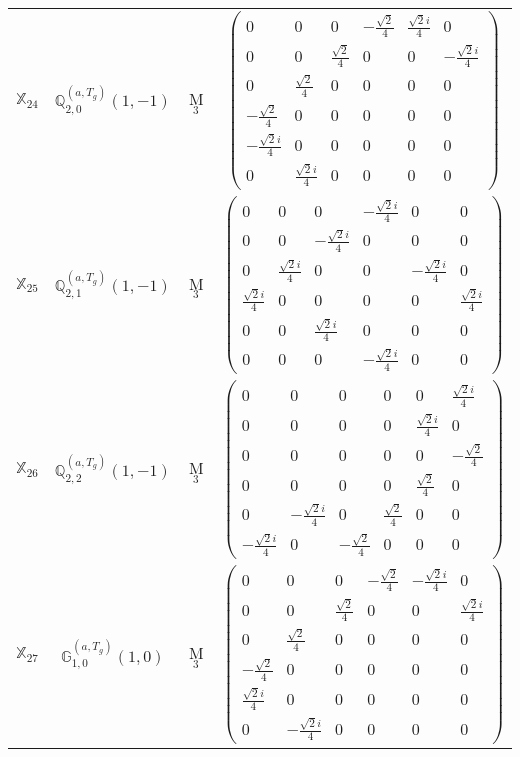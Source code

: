 \documentclass[fleqn,10pt,landscape]{article}
\begin{document}
\begin{itemize}
\begin{center}
\begin{longtable}{c|c|c|c}
$ \mathbb{X}_{24} $ & $\mathbb{Q}_{2,0}^{(a,T_{g})}(1,-1)$ & M$_{3}$ & $\begin{pmatrix} 0 & 0 & 0 & - \frac{\sqrt{2}}{4} & \frac{\sqrt{2} i}{4} & 0 \\ 0 & 0 & \frac{\sqrt{2}}{4} & 0 & 0 & - \frac{\sqrt{2} i}{4} \\ 0 & \frac{\sqrt{2}}{4} & 0 & 0 & 0 & 0 \\ - \frac{\sqrt{2}}{4} & 0 & 0 & 0 & 0 & 0 \\ - \frac{\sqrt{2} i}{4} & 0 & 0 & 0 & 0 & 0 \\ 0 & \frac{\sqrt{2} i}{4} & 0 & 0 & 0 & 0 \end{pmatrix}$ \\
$ \mathbb{X}_{25} $ & $\mathbb{Q}_{2,1}^{(a,T_{g})}(1,-1)$ & M$_{3}$ & $\begin{pmatrix} 0 & 0 & 0 & - \frac{\sqrt{2} i}{4} & 0 & 0 \\ 0 & 0 & - \frac{\sqrt{2} i}{4} & 0 & 0 & 0 \\ 0 & \frac{\sqrt{2} i}{4} & 0 & 0 & - \frac{\sqrt{2} i}{4} & 0 \\ \frac{\sqrt{2} i}{4} & 0 & 0 & 0 & 0 & \frac{\sqrt{2} i}{4} \\ 0 & 0 & \frac{\sqrt{2} i}{4} & 0 & 0 & 0 \\ 0 & 0 & 0 & - \frac{\sqrt{2} i}{4} & 0 & 0 \end{pmatrix}$ \\
$ \mathbb{X}_{26} $ & $\mathbb{Q}_{2,2}^{(a,T_{g})}(1,-1)$ & M$_{3}$ & $\begin{pmatrix} 0 & 0 & 0 & 0 & 0 & \frac{\sqrt{2} i}{4} \\ 0 & 0 & 0 & 0 & \frac{\sqrt{2} i}{4} & 0 \\ 0 & 0 & 0 & 0 & 0 & - \frac{\sqrt{2}}{4} \\ 0 & 0 & 0 & 0 & \frac{\sqrt{2}}{4} & 0 \\ 0 & - \frac{\sqrt{2} i}{4} & 0 & \frac{\sqrt{2}}{4} & 0 & 0 \\ - \frac{\sqrt{2} i}{4} & 0 & - \frac{\sqrt{2}}{4} & 0 & 0 & 0 \end{pmatrix}$ \\
$ \mathbb{X}_{27} $ & $\mathbb{G}_{1,0}^{(a,T_{g})}(1,0)$ & M$_{3}$ & $\begin{pmatrix} 0 & 0 & 0 & - \frac{\sqrt{2}}{4} & - \frac{\sqrt{2} i}{4} & 0 \\ 0 & 0 & \frac{\sqrt{2}}{4} & 0 & 0 & \frac{\sqrt{2} i}{4} \\ 0 & \frac{\sqrt{2}}{4} & 0 & 0 & 0 & 0 \\ - \frac{\sqrt{2}}{4} & 0 & 0 & 0 & 0 & 0 \\ \frac{\sqrt{2} i}{4} & 0 & 0 & 0 & 0 & 0 \\ 0 & - \frac{\sqrt{2} i}{4} & 0 & 0 & 0 & 0 \end{pmatrix}$ \\

\end{longtable}
\end{center}
\end{itemize}
\end{document}
